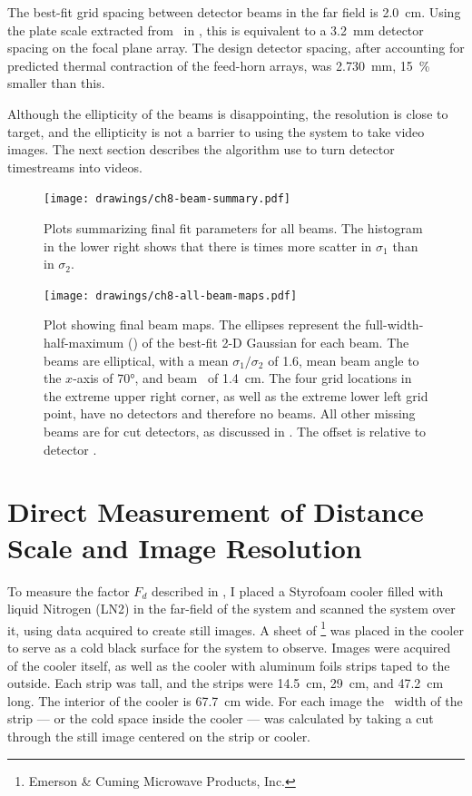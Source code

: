 The best-fit grid spacing between detector beams in the far field is \SI{2.0}{\cm}.
Using the plate scale extracted from \ZEMAX\ in , this is equivalent to a \SI{3.2}{\mm} detector spacing on the focal plane array.
The design detector spacing, after accounting for predicted thermal contraction of the feed-horn arrays, was \SI{2.730}{\mm}, \SI{15}{\percent} smaller than this.

Although the ellipticity of the beams is disappointing, the resolution is close to target, and the ellipticity is not a barrier to using the system to take video images. The next section describes the algorithm use to turn detector timestreams into videos.

\begin{figure}[th]
\centering
\texttt{[image: drawings/ch8-beam-summary.pdf]}
\caption{
  Plots summarizing final fit parameters for all beams.
  The histogram in the lower right shows that there is  times more scatter in $\sigma_1$ than in $\sigma_2$. 
}
\label{fig:ch8-beam-summary}
\end{figure}

\begin{figure}[th]
\centering
\texttt{[image: drawings/ch8-all-beam-maps.pdf]}
\caption{
Plot showing final beam maps.
The ellipses represent the full-width-half-maximum (\FWHM) of the best-fit 2-D Gaussian for each beam. The beams are elliptical, with a mean $\sigma_1/\sigma_2$ of 1.6, mean beam angle to the $x$-axis of \ang{70}, and beam \FWHM\ of \SI{1.4}{\cm}.
The four grid locations in the extreme upper right corner, as well as the extreme lower left grid point, have no detectors and therefore no beams. All other missing beams are for cut detectors, as discussed in .
The offset is relative to detector .
}
\label{fig:ch8-all-beam-maps}
\end{figure}

\section{Direct Measurement of Distance Scale and Image Resolution} \label{sec:ch8-dist-scale}

To measure the factor $F_d$ described in , I placed a Styrofoam cooler filled with liquid Nitrogen (LN2) in the far-field of the system and scanned the system over it, using data acquired to create still images.
A sheet of \ecco\footnote{Emerson \& Cuming Microwave Products, Inc.} was placed in the cooler to serve as a cold black surface for the system to observe.
Images were acquired of the cooler itself, as well as the cooler with aluminum foils strips taped to the outside.
Each strip was  tall, and the strips were \SI{14.5}{\cm}, \SI{29}{\cm}, and \SI{47.2}{\cm} long.
The interior of the cooler is \SI{67.7}{\cm} wide.
For each image the \FWHM\ width of the strip --- or the cold space inside the cooler --- was calculated by taking a cut through the still image centered on the strip or cooler.

